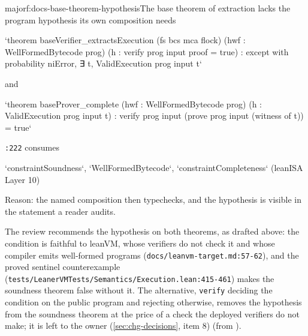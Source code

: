\begin{finding}{major}{f:docs-base-theorem-hypothesis}{The base theorem of extraction lacks the program hypothesis its own composition needs}
\begin{srccode}
`theorem baseVerifier_extractsExecution (fs bcs mca flock) (hwf : WellFormedBytecode prog) (h : verify prog input proof = true) : except with probability niError, ∃ t, ValidExecution prog input t`
\end{srccode}

and

\begin{srccode}
`theorem baseProver_complete (hwf : WellFormedBytecode prog) (h : ValidExecution prog input t) : verify prog input (prove prog input (witness of t)) = true`
\end{srccode}

\texttt{:\allowbreak{}222} consumes

\begin{srccode}
`constraintSoundness`, `WellFormedBytecode`, `constraintCompleteness` (leanISA Layer 10)
\end{srccode}

Reason: the named composition then typechecks, and the hypothesis is visible in the statement a reader audits.

\begin{sloppypar}
The review recommends the hypothesis on both theorems, as drafted above: the condition is faithful to leanVM, whose verifiers do not check it and whose compiler emits well-formed programs (\texttt{docs/\allowbreak{}leanvm-\allowbreak{}target.\allowbreak{}md:\allowbreak{}57-\allowbreak{}62}), and the proved sentinel counterexample (\texttt{tests/\allowbreak{}Leaner\allowbreak{}VMTests/\allowbreak{}Semantics/\allowbreak{}Execution.\allowbreak{}lean:\allowbreak{}415-\allowbreak{}461}) makes the soundness theorem false without it. The alternative, \texttt{verify} deciding the condition on the public program and rejecting otherwise, removes the hypothesis from the soundness theorem at the price of a check the deployed verifiers do not make; it is left to the owner (\cref{sec:chg-decisions}, item 8) (from ).
\end{sloppypar}
\end{finding}


